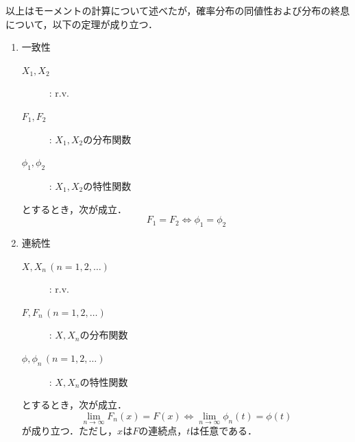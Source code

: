 \documentclass{jsreport}
\begin{document}
以上はモーメントの計算について述べたが，確率分布の同値性および分布の終息について，以下の定理が成り立つ．

\begin{screen}
  \begin{theo}
    \begin{enumerate}
      \item 一致性
      \begin{description}
        \item[$X_1, X_2$] : r.v.
        \item[$F_1, F_2$] : $X_1, X_2$の分布関数
        \item[$\phi_1, \phi_2$] : $X_1, X_2$の特性関数
      \end{description}
      とするとき，次が成立．
      \begin{equation}
        F_1 = F_2 \Longleftrightarrow \phi_1 = \phi_2 \nonumber
      \end{equation}
      \item 連続性
      \begin{description}
        \item[$X, X_n \, (n = 1, 2, \ldots)$] : r.v.
        \item[$F, F_n \, (n = 1, 2, \ldots)$] : $X, X_n$の分布関数
        \item[$\phi, \phi_n \, (n = 1, 2, \ldots)$] : $X, X_n$の特性関数
      \end{description}
      とするとき，次が成立．
      \begin{equation}
        \lim_{n \to \infty} F_n(x) = F(x) \Longleftrightarrow \lim_{n \to \infty} \phi_n(t) = \phi(t) \nonumber
      \end{equation}
      が成り立つ．ただし，$x$は$F$の連続点，$t$は任意である．
    \end{enumerate}
  \end{theo}
\end{screen}
\end{document}
